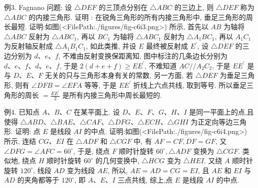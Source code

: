 例3. Fagnano 问题: 设 $\triangle D E F$ 的三顶点分别在 $\triangle A B C$ 的三边上, 则 $\triangle D E F$ 称为 $\triangle A B C$ 的内接三角形.
证明 : 在锐角三角形的所有内接三角形中, 垂足三角形的周长最短.
证明:如图(<FilePath:./figures/fig-c6i3.png>) 所示, 首先以 $A B$ 为轴将 $\triangle A B C$ 反射为 $\triangle A B C_1$, 再以 $B C_1$ 为轴将 $\triangle A B C_1$ 反射为 $\triangle A_1 B C_1$, 再以 $A_1 C_1$ 为反射轴反射成 $\triangle A_1 B_1 C_1$, 如此类推, 并设 $E$ 最终被反射成 $E^{\prime}$, 设 $\triangle D E F$ 的三边分别为 $d 、 e 、 f$, 不难由反射变换保距离知, 图中标注的几条边长分别为 $d 、 e 、 f 、 d 、 e 、 f$, 于是 $2(d+ e+f) \geqslant E E^{\prime}$, 不难知道 $A C / / A_2 C_2$, 于是 $E E^{\prime}$ 是与 $D 、 E 、 F$ 无关的只与三角形本身有关的常数, 另一方面, 若 $\triangle D E F$ 为垂足三角形, 则有 $\angle D F B= \angle E F A$ 等等, 于是 $E E^{\prime}$ 折线上六点共线, 取到等号.
所以垂足三角形的周长 $=\frac{E E^{\prime}}{2}$ 是所有内接三角形中周长最短的.



例4. 已知点 $A 、 B 、 C$ 在某平面上.
设 $D 、 E 、 F 、 G 、 H 、 I$ 是同一平面上的点,且使得 $\triangle A B D 、 \triangle B A E 、 \triangle C A F 、 \triangle D F G 、 \triangle E C H 、 \triangle G H I$ 为正定向等边三角形.
证明: 点 $E$ 是线段 $A I$ 的中点.
证明:如图(<FilePath:./figures/fig-c6i4.png>) 所示, 连结 $C G 、 E I$ 在 $\triangle A D F$ 和 $\triangle C G F$ 中, 有 $A F=C F, D F=G F$, 又 $\angle D F G= \angle A F C=60^{\circ}$, 于是, 绕点 $F$ 顺时针旋转 $60^{\circ}, \triangle A D F$ 变换为 $\triangle C G F$.
类似地, 绕点 $H$ 顺时针旋转 $60^{\circ}$ 的几何变换中, $\triangle H C G$ 变为 $\triangle H E I$.
又绕 $A$ 顺时针旋转 $120^{\circ}$, 线段 $A D$ 变为线段 $A E$, 所以, $A E=A D=C G=E I$, 且 $A E$ 和 $E I$ 与 $A D$ 的夹角都等于 $120^{\circ}$, 即 $A 、 E 、 I$ 三点共线, 综上,点 $E$ 是线段 $A I$ 的中点.



